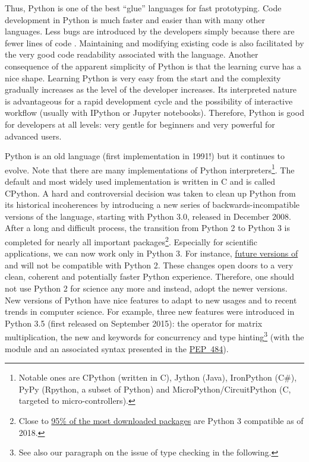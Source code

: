 %
Thus, Python is one of the best ``glue'' languages for fast prototyping.
Code development in Python is much faster and easier than with many other
languages. Less bugs are introduced by the developers simply because there are
fewer lines of code \citep{nanz_comparative_2015}.
%
Maintaining and modifying existing code is also facilitated by the very good code
readability associated with the language.
%
Another consequence of the apparent simplicity of Python is that the learning
curve has a nice shape. Learning Python is very easy from the start and the
complexity gradually increases as the level of the developer increases.
%
Its interpreted nature is advantageous for a rapid development cycle and the
possibility of interactive workflow (usually with IPython or Jupyter
notebooks).
%
Therefore, Python is good for developers at all levels: very gentle for
beginners and very powerful for advanced users.

Python is an old language (first implementation in 1991!) but it continues to
evolve.
%
Note that there are many implementations of Python
interpreters\footnote{Notable ones are CPython (written in C), Jython (Java),
IronPython (C\#), PyPy (Rpython, a subset of Python) and
MicroPython/CircuitPython (C, targeted to micro-controllers).}. The default and
most widely used implementation is written in C and is called CPython.
%
A hard and controversial decision was taken to clean up Python from its
historical incoherences by introducing a new series of backwards-incompatible
versions of the language, starting with Python 3.0, released in December 2008.
After a long and difficult process, the transition from Python 2 to Python 3 is
completed for nearly all important packages\footnote{Close to
\href{https://python3wos.appspot.com/}{95\% of the most downloaded packages}
are Python 3 compatible as of 2018.}. Especially for scientific applications,
we can now work only in Python 3. For instance, \href{https://github.com/%
numpy/numpy/blob/master/doc/neps/dropping-python2.7-proposal.rst}{future
versions of \Numpy} and  will not be compatible with Python 2. These changes
open doors to a very clean, coherent and potentially faster Python
experience. Therefore, one should not use Python 2 for science any more and
instead, adopt the newer versions.
%
New versions of Python have nice features to adapt to new usages and to
recent trends in computer science.  For example, three new features were
introduced in Python 3.5 (first released on September 2015): the 
operator for matrix multiplication, the new  and
 keywords for concurrency and type hinting\footnote{See also our
paragraph on the issue of type checking in the following.} (with the module
 and an associated syntax presented in the
\href{https://www.python.org/dev/peps/pep-0484/}{PEP~484}).

